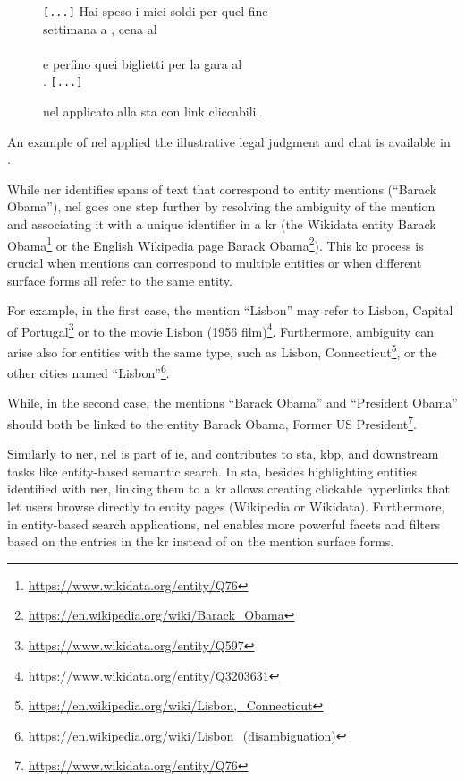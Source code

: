 \begin{figure}[htbp]
\begin{minipage}[t]{0.48\linewidth}
\quad \texttt{[...]} Hai speso i miei soldi per quel fine\\
\quad settimana a , cena al \\
\quad {}\\
\quad e perfino quei biglietti per la gara al\\
\quad {}. \texttt{[...]}\\
\label{fig:extract-nel-chat-logs}
\end{minipage}
\caption{\Ac{nel} applicato alla \acl{sta} con link cliccabili.}
\label{fig:extracts-nel-new}
\end{figure}


An example of \ac{nel} applied the illustrative legal judgment and chat is available in . 



While \acl{ner} identifies spans of text that correspond to entity mentions (\eg ``Barack Obama''), \acl{nel} goes one step further by resolving the ambiguity of the mention and associating it with a unique identifier in a \acl{kr} (\eg the Wikidata entity Barack Obama\footnote{\url{https://www.wikidata.org/entity/Q76}} or the English Wikipedia page Barack Obama\footnote{\url{https://en.wikipedia.org/wiki/Barack_Obama}}). This \acl{kc} process is crucial when mentions can correspond to multiple entities or when different surface forms all refer to the same entity.

For example, in the first case, the mention ``Lisbon'' may refer to Lisbon, Capital of Portugal\footnote{\url{https://www.wikidata.org/entity/Q597}} or to the movie Lisbon (1956 film)\footnote{\url{https://www.wikidata.org/entity/Q3203631}}. Furthermore, ambiguity can arise also for entities with the same type, such as Lisbon, Connecticut\footnote{\url{https://en.wikipedia.org/wiki/Lisbon,_Connecticut}}, or the other cities named ``Lisbon''\footnote{\url{https://en.wikipedia.org/wiki/Lisbon_(disambiguation)}}.

While, in the second case, the mentions ``Barack Obama'' and ``President Obama'' should both be linked to the entity Barack Obama, Former US President\footnote{\url{https://www.wikidata.org/entity/Q76}}.

Similarly to \acl{ner}, \acl{nel} is part of \acl{ie}, and contributes to \acf{sta}, \acf{kbp}, and downstream tasks like entity-based semantic search. In \ac{sta}, besides highlighting entities identified with \ac{ner}, linking them to a \acl{kr} allows creating clickable hyperlinks that let users browse directly to entity pages (\eg Wikipedia or Wikidata).
Furthermore, in entity-based search applications, \ac{nel} enables more powerful facets and filters based on the entries in the \ac{kr} instead of on the mention surface forms.

